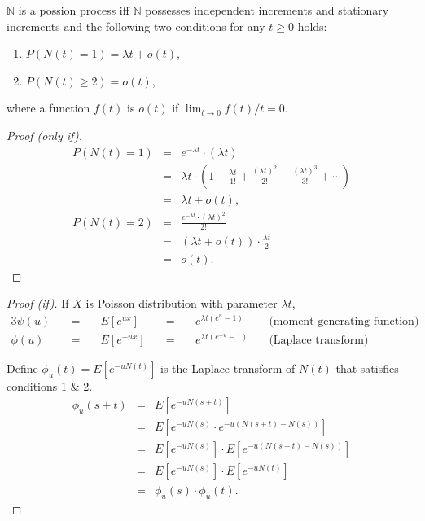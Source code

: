 \begin{theorem}[操作型定義] \label{thm:op_def}
$ \mathbb{N} $ is a possion process iff $ \mathbb{N} $ possesses independent increments and stationary increments and the following two conditions for any $ t \ge 0 $ holds:
\begin{enumerate}
  \item $ P(N(t) = 1) = \lambda t + o(t) $,
  \item $ P(N(t) \ge 2) = o(t) $,
\end{enumerate}
where a function $ f(t) $ is $ o(t) $ if $ \lim_{t \to 0} f(t) / t = 0 $.

\begin{proof}[Proof (only if)]
\begin{eqnarray*}
P(N(t) = 1)
  & = & e^{-\lambda t} \cdot (\lambda t) \\
  & = & \lambda t \cdot \left( 1 - \frac{\lambda t}{1!} + \frac{(\lambda t)^{2}}{2!} - \frac{(\lambda t)^{3}}{3!} + \cdots \right) \\
  & = & \lambda t + o(t), \\
P(N(t) = 2)
  & = & \frac{e^{-\lambda t} \cdot (\lambda t)^{2}}{2!} \\
  & = & (\lambda t + o(t)) \cdot \frac{\lambda t}{2} \\
  & = & o(t).
\end{eqnarray*}
\end{proof}

\begin{proof}[Proof (if)]
If $ X $ is Poisson distribution with parameter $ \lambda t $,
\begin{alignat*}{3}
\psi(u) & \quad=\quad & E[e^{ux}] & \quad=\quad & e^{\lambda t (e^{u} - 1)} & \quad\text{(moment generating function)} \\
\phi(u) & \quad=\quad & E[e^{-ux}] & \quad=\quad & e^{\lambda t (e^{-u} - 1)} & \quad\text{(Laplace transform)}
\end{alignat*}

Define $ \phi_{u}(t) = E[e^{-uN(t)}] $ is the Laplace transform of $ N(t) $ that satisfies conditions 1 \& 2.
\begin{eqnarray*}
\phi_{u}(s + t)
  & = & E[e^{-uN(s + t)}] \\
  & = & E[e^{-uN(s)} \cdot e^{-u(N(s + t) - N(s))}] \\
  & = & E[e^{-uN(s)}] \cdot E[e^{-u(N(s + t) - N(s))}] \\
  & = & E[e^{-uN(s)}] \cdot E[e^{-uN(t)}] \\
  & = & \phi_{u}(s) \cdot \phi_{u}(t).
\end{eqnarray*}


\end{proof}
\end{theorem}
